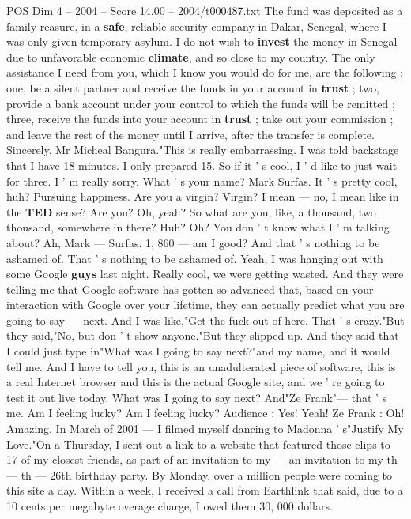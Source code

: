 \begin{textsample}{POS Dim 4 – 2004 – Score 14.00 – 2004/t000487.txt}
The fund was deposited as a family reasure, in a \textbf{safe}, reliable security company in Dakar, Senegal, where I was only given temporary asylum.
I do not wish to \textbf{invest} the money in Senegal due to unfavorable economic \textbf{climate}, and so close to my country.
The only assistance I need from you, which I know you would do for me, are the following : one, be a silent partner and receive the funds in your account in \textbf{trust} ; two, provide a bank account under your control to which the funds will be remitted ; three, receive the funds into your account in \textbf{trust} ; take out your commission ; and leave the rest of the money until I arrive, after the transfer is complete.
Sincerely, Mr Micheal Bangura."This is really embarrassing.
I was told backstage that I have 18 minutes.
I only prepared 15.
So if it ' s cool, I ' d like to just wait for three.
I ' m really sorry.
What ' s your name?
Mark Surfas.
It ' s pretty cool, huh?
Pursuing happiness.
Are you a virgin?
Virgin?
I mean — no, I mean like in the \textbf{TED} sense?
Are you?
Oh, yeah?
So what are you, like, a thousand, two thousand, somewhere in there?
Huh?
Oh?
You don ' t know what I ' m talking about?
Ah, Mark — Surfas. 1, 860 — am I good?
And that ' s nothing to be ashamed of.
That ' s nothing to be ashamed of.
Yeah, I was hanging out with some Google \textbf{guys} last night.
Really cool, we were getting wasted.
And they were telling me that Google software has gotten so advanced that, based on your interaction with Google over your lifetime, they can actually predict what you are going to say — next.
And I was like,"Get the fuck out of here.
That ' s crazy."But they said,"No, but don ' t show anyone."But they slipped up.
And they said that I could just type in"What was I going to say next?"and my name, and it would tell me.
And I have to tell you, this is an unadulterated piece of software, this is a real Internet browser and this is the actual Google site, and we ' re going to test it out live today.
What was I going to say next?
And"Ze Frank"— that ' s me.
Am I feeling lucky?
Am I feeling lucky?
Audience : Yes!
Yeah!
Ze Frank : Oh!
Amazing.
In March of 2001 — I filmed myself dancing to Madonna ' s"Justify My Love."On a Thursday, I sent out a link to a website that featured those clips to 17 of my closest friends, as part of an invitation to my — an invitation to my th — th — 26th birthday party.
By Monday, over a million people were coming to this site a day.
Within a week, I received a call from Earthlink that said, due to a 10 cents per megabyte overage charge, I owed them 30, 000 dollars.

\end{textsample}
